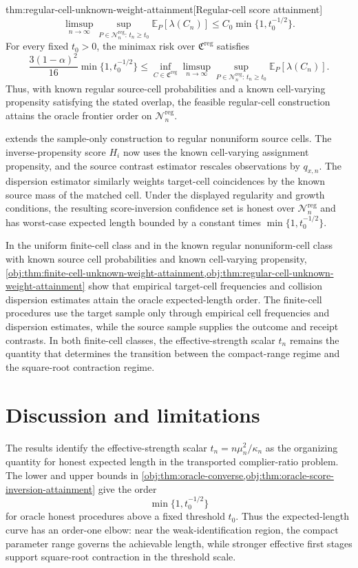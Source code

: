 \documentclass[11pt]{article}
\begin{document}
\begin{theoremv}{thm:regular-cell-unknown-weight-attainment}[Regular-cell score attainment]
\[
\limsup_{n\to\infty}\sup_{P\in\mathcal N_n^{\mathrm{reg}}:\,t_n\ge t_0}
\mathbb E_P[\lambda(C_n)]
\le
C_0\min\{1,t_0^{-1/2}\}.
\]
For every fixed \(t_0>0\), the minimax risk over \(\mathfrak C^{\mathrm{reg}}\) satisfies
\[
\frac{3(1-\alpha)^2}{16}\min\{1,t_0^{-1/2}\}
\le
\inf_{C\in\mathfrak C^{\mathrm{reg}}}
\limsup_{n\to\infty}\sup_{P\in\mathcal N_n^{\mathrm{reg}}:\,t_n\ge t_0}
\mathbb E_P[\lambda(C_n)].
\]
Thus, with known regular source-cell probabilities and a known cell-varying propensity satisfying the stated overlap, the feasible regular-cell construction attains the oracle frontier order on \(\mathcal N_n^{\mathrm{reg}}\).
\end{theoremv}

 extends the sample-only construction to regular nonuniform source cells. The inverse-propensity score \(H_i\) now uses the known cell-varying assignment propensity, and the source contrast estimator rescales observations by \(q_{x,n}\). The dispersion estimator similarly weights target-cell coincidences by the known source mass of the matched cell. Under the displayed regularity and growth conditions, the resulting score-inversion confidence set is honest over \(\mathcal N_n^{\mathrm{reg}}\) and has worst-case expected length bounded by a constant times \(\min\{1,t_0^{-1/2}\}\).

In the uniform finite-cell class and in the known regular nonuniform-cell class with known source cell probabilities and known cell-varying propensity, \cref{obj:thm:finite-cell-unknown-weight-attainment,obj:thm:regular-cell-unknown-weight-attainment} show that empirical target-cell frequencies and collision dispersion estimates attain the oracle expected-length order. The finite-cell procedures use the target sample only through empirical cell frequencies and dispersion estimates, while the source sample supplies the outcome and receipt contrasts. In both finite-cell classes, the effective-strength scalar \(t_n\) remains the quantity that determines the transition between the compact-range regime and the square-root contraction regime.


\section{Discussion and limitations}

The results identify the effective-strength scalar \(t_n=n\mu_n^2/\kappa_n\) as the organizing quantity for honest expected length in the transported complier-ratio problem. The lower and upper bounds in \cref{obj:thm:oracle-converse,obj:thm:oracle-score-inversion-attainment} give the order
\[
\min\{1,t_0^{-1/2}\}
\]
for oracle honest procedures above a fixed threshold \(t_0\). Thus the expected-length curve has an order-one elbow: near the weak-identification region, the compact parameter range governs the achievable length, while stronger effective first stages support square-root contraction in the threshold scale.
\end{document}
